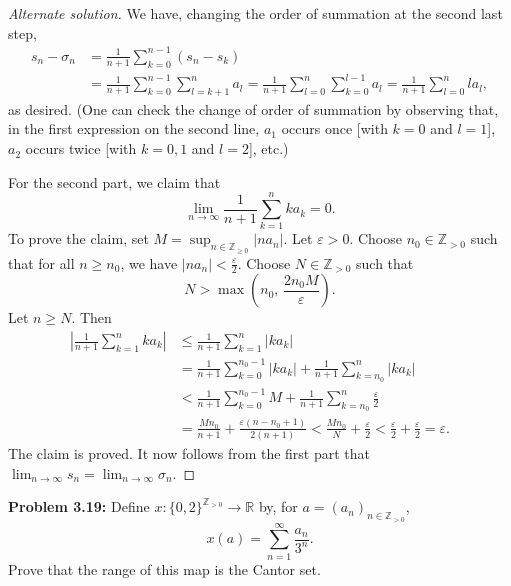 \documentclass[10pt]{amsart}
\newcommand{\I}{\infty}
\newcommand{\limi}[1]{\lim_{{#1} \to \infty}}
\theoremstyle{definition}
\newcommand{\ep}{\varepsilon}
\newcommand{\sm}{\sigma}
\newcommand{\R}{{\mathbb{R}}}
\newcommand{\N}{{\mathbb{Z}}_{> 0}}
\newcommand{\Nz}{{\mathbb{Z}}_{\geq 0}}
\begin{document}
\begin{proof}[Alternate solution]
We have,
changing the order of summation at the second last step,
\begin{align*}
s_n - \sm_n
& = \frac{1}{n + 1} \sum_{k = 0}^{n - 1} (s_n - s_k)
\\
& = \frac{1}{n + 1} \sum_{k = 0}^{n - 1} \sum_{l = k + 1}^n a_l
  = \frac{1}{n + 1} \sum_{l = 0}^{n} \sum_{k = 0}^{l - 1} a_l
  = \frac{1}{n + 1} \sum_{l = 0}^{n} l a_l,
\end{align*}
as desired.
(One can check the change of order of summation by observing that,
in the first expression on the second line, $a_1$ occurs once
[with $k = 0$ and $l = 1$],
$a_2$ occurs twice [with $k = 0, 1$ and $l = 2$],
etc.)

For the second part,
we claim that
\[
\limi{n} \frac{1}{n + 1} \sum_{k = 1}^n k a_k = 0.
\]
To prove the claim,
set $M = \sup_{n \in \Nz} | n a_n |$.
Let $\ep > 0$.
Choose $n_0 \in \N$ such that for all $n \geq n_0$,
we have $| n a_n | < \frac{\ep}{2}$.
Choose $N \in \N$ such that
\[
N > \max \left( n_0, \, \frac{2 n_0 M}{\ep} \right).
\]
Let $n \geq N$.
Then
%
\begin{align*}
\left| \frac{1}{n + 1} \sum_{k = 1}^n k a_k \right|
& \leq \frac{1}{n + 1} \sum_{k = 1}^n | k a_k |
\\
& = \frac{1}{n + 1} \sum_{k = 0}^{n_0 - 1} | k a_k |
     + \frac{1}{n + 1} \sum_{k = n_0}^n | k a_k |
\\
& < \frac{1}{n + 1} \sum_{k = 0}^{n_0 - 1} M
     + \frac{1}{n + 1} \sum_{k = n_0}^n \frac{\ep}{2}
\\
& = \frac{M n_0}{n + 1} + \frac{\ep (n - n_0 + 1)}{2 (n + 1)}
  < \frac{M n_0}{N} + \frac{\ep}{2}
  < \frac{\ep}{2} + \frac{\ep}{2}
  = \ep.
\end{align*}
%
The claim is proved.
It now follows from the first part that
$\limi{n} s_n = \limi{n} \sm_n$.
\end{proof}


\vspace{2ex}

\noindent
{\textbf{Problem 3.19:}}
Define $x \colon \{ 0, 2 \}^{\N} \to \R$
by, for $a = (a_n)_{n \in \N}$,
\[
x (a) = \sum_{n = 1}^{\I} \frac{a_n}{3^n}.
\]
Prove that the range of this map is the Cantor set.
\end{document}
